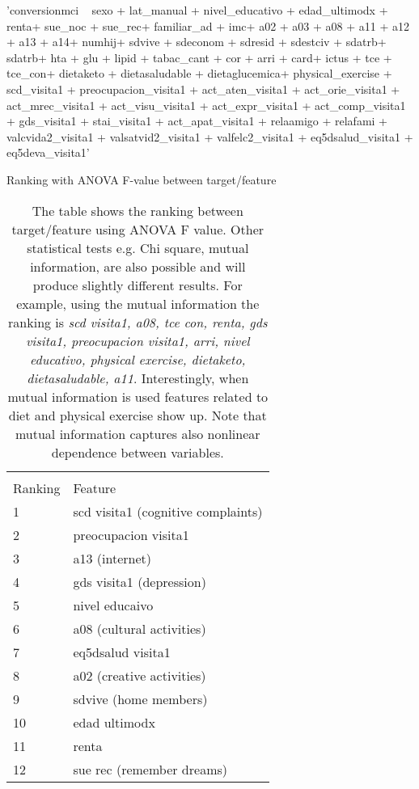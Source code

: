 \documentclass[11pt]{article}
\theoremstyle{definition}
\theoremstyle{remark}
\begin{document}
\begin{code}[caption=Regression formula, label=formula]
'conversionmci ~ sexo + lat_manual + nivel_educativo  + edad_ultimodx + renta+ sue_noc + sue_rec+ familiar_ad + imc+ a02 + a03 + a08 + a11 + a12 + a13 + a14+ numhij+ sdvive + sdeconom + sdresid + sdestciv + sdatrb+ sdatrb+ hta + glu + lipid + tabac_cant + cor + arri + card+ ictus + tce + tce_con+ dietaketo + dietasaludable + dietaglucemica+ physical_exercise + scd_visita1 + preocupacion_visita1 + act_aten_visita1 + act_orie_visita1 + act_mrec_visita1 + act_visu_visita1 + act_expr_visita1 + act_comp_visita1 + gds_visita1 + stai_visita1 + act_apat_visita1 + relaamigo + relafami + valcvida2_visita1 + valsatvid2_visita1 + valfelc2_visita1 + eq5dsalud_visita1 + eq5deva_visita1'
\end{code}

\begin{table}[H]
\caption{Ranking with ANOVA F-value between target/feature} \label{tab:ranking} 
\begin{center} 
\begin{tabular}{ll}
\hline
\multicolumn{1}{c}{} \\
Ranking & Feature     \\
\hline
1 & scd visita1 (cognitive complaints)         \\
2 & preocupacion visita1 \\
3 & a13 (internet) \\
4 & gds visita1 (depression)\\
5 & nivel educaivo \\
6 & a08 (cultural activities)\\
7 & eq5dsalud visita1 \\
8 & a02 (creative activities) \\
9 & sdvive (home members)\\
10 & edad ultimodx \\
11 & renta \\
12 & sue rec (remember dreams) \\
\hline
\end{tabular}
\caption{The table shows the ranking between target/feature using ANOVA F value. Other statistical tests e.g. Chi square, mutual information, are also possible and will produce slightly different results. For example, using the mutual information the ranking is \emph{scd visita1, a08, tce con, renta, gds visita1, preocupacion visita1, arri, nivel educativo, physical exercise, dietaketo, dietasaludable, a11}. Interestingly, when mutual information is used features related to diet and physical exercise show up. Note that mutual information captures also nonlinear dependence between variables.}
\end{center}
\end{table}
\end{document}
